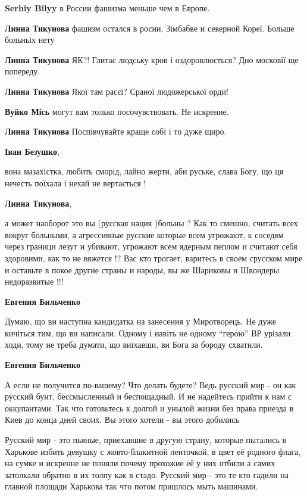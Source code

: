 \begin{itemize}
\begin{itemize}
\textbf{Serhiy Bilyy} в России фашизма меньше чем в Европе.

\textbf{Линна Тикунова} фашизм остался в росии, Зімбабве и северной Кореї. Больше больньіх нету

\textbf{Линна Тикунова} ЯК?! Глитає людську кров і оздоровлюється? Дно московії ще попереду.

\textbf{Линна Тикунова} Якої там расєї? Сраної людожерської орди!

\textbf{Вуйко Місь} могут вам только посочувствовать. Не искренне.

\textbf{Линна Тикунова} Поспівчувайте краще собі і то дуже щиро.

\textbf{Іван Безушко}, 

вона мазахістка, любить сморід, лайно жерти, аби руське, слава Богу, що ця
нечесть поїхала і нехай не вертається !

\textbf{Линна Тикунова}, 

а может наоборот это вы (русская нация )больны ? Как то смешно, считать всех
вокруг больными, а агрессивные русские которые всем угрожают, к соседям через
граници лезут и убивают, угрожают всем ядерным пеплом и считают себя здоровими,
как то не вяжется !? Вас кто трогает, варитесь в своем срусском мире и оставьте
в покое другие страны и народы, вы же Шариковы и Швондеры недоразвитые !!!

\textbf{Евгения Бильченко} 

Думаю, що ви наступна кандидатка на занесення у Миротворець. Не дуже кичіться
тим, що ви написали. Одному і навіть не одному \enquote{герою} ВР урізали ходи, тому не
треба думати, що виїхавши, ви Бога за бороду схватили.

\textbf{Евгения Бильченко} 

А если не получится по-вашему? Что делать будете? Ведь русский мир - он как
русский бунт, бессмысленный и беспощадный. И не надейтесь прийти к нам с
оккупантами. Так что готовьтесь к долгой и унылой жизни без права приезда в
Киев до конца дней своих. Вы этого хотели - вы этого добились

\end{itemize} %


Русский мир - это пьяные, приехавшие в другую страну, которые пытались в
Харькове избить девушку с жовто-блакитной ленточкой, в цвет её родного флага,
на сумке и искренне не поняли почему прохожие её у них отбили а самих затолкали
обратно в их толпу как в стадо. Русский мир - это те кто гадили на главной
площади Харькова так что потом пришлось мыть машинами.


\end{itemize}
